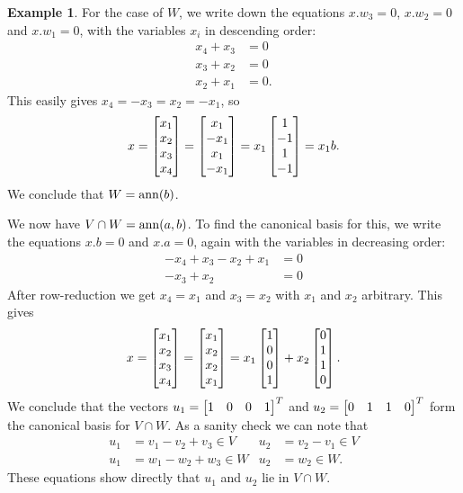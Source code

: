 \documentclass[reqno]{amsart}
\theoremstyle{definition}
\newtheorem{example}[theorem]{Example}
\begin{document}
\begin{example}
 For the case of $W$, we write down the
 equations $x.w_3=0$, $x.w_2=0$ and $x.w_1=0$, with the variables
 $x_i$ in descending order:
 \begin{align*}
  x_4+x_3 &= 0 \\
  x_3+x_2 &= 0 \\
  x_2+x_1 &= 0.
 \end{align*}
 This easily gives $x_4=-x_3=x_2=-x_1$, so
 \[ x
    = \left[\begin{matrix} x_1 \\ x_2 \\ x_3 \\ x_4 \end{matrix}\right]
    = \left[\begin{matrix} x_1 \\ -x_1 \\ x_1 \\ -x_1 \end{matrix}\right]
    = x_1 \left[\begin{matrix} 1 \\ -1 \\ 1 \\ -1 \end{matrix}\right]
    = x_1 b.
 \]
 We conclude that $W=\operatorname{ann}(b)$.

 We now have $V\cap W=\operatorname{ann}(a,b)$.  To find the canonical basis for
 this, we write the equations $x.b=0$ and $x.a=0$, again with the
 variables in decreasing order:
 \begin{align*}
  -x_4+x_3-x_2+x_1 &= 0 \\
   -x_3+x_2 &= 0
 \end{align*}
 After row-reduction we get $x_4=x_1$ and $x_3=x_2$ with $x_1$ and
 $x_2$ arbitrary.  This gives
 \[ x
    = \left[\begin{matrix} x_1 \\ x_2 \\ x_3 \\ x_4 \end{matrix}\right]
    = \left[\begin{matrix} x_1 \\ x_2 \\ x_2 \\ x_1 \end{matrix}\right]
    = x_1 \left[\begin{matrix} 1 \\ 0 \\ 0 \\ 1 \end{matrix}\right] +
      x_2 \left[\begin{matrix} 0 \\ 1 \\ 1 \\ 0 \end{matrix}\right].
 \]
 We conclude that the vectors $u_1=\left[\begin{matrix} 1&0&0&1\end{matrix}\right]^T$ and
 $u_2=\left[\begin{matrix} 0&1&1&0\end{matrix}\right]^T$ form the canonical basis for $V\cap W$.  As
 a sanity check we can note that
 \begin{align*}
  u_1 &= v_1-v_2+v_3\in V & u_2 &= v_2-v_1\in V \\
  u_1 &= w_1-w_2+w_3\in W & u_2 &= w_2\in W.
 \end{align*}
 These equations show directly that $u_1$ and $u_2$ lie in $V\cap W$.
\end{example}
\end{document}

